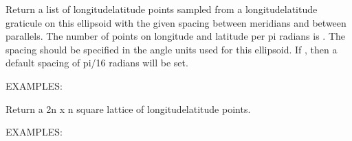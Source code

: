 \documentclass[a4paper,12ptopenany,oneside,english]{sphinxmanual}
\begin{document}
\begin{fulllineitems}
\begin{fulllineitems}
\end{fulllineitems}


\begin{fulllineitems}
\label{\detokenize{ellipsoids:rhealpixdggs.ellipsoids.Ellipsoid.graticule}}
\pysigstartsignatures
\pysiglinewithargsret
{}
{\sphinxparamcomma {}}
{}
\pysigstopsignatures
\sphinxAtStartPar
Return a list of longitude\sphinxhyphen{}latitude points sampled from a
longitude\sphinxhyphen{}latitude graticule on this ellipsoid with the given
spacing between meridians and between parallels.
The number of points on longitude and latitude per pi radians is .
The spacing should be specified in the angle units used for this
ellipsoid.
If , then a default spacing of pi/16 radians will be set.

\sphinxAtStartPar
EXAMPLES:

\begin{sphinxVerbatim}[commandchars=\\\{\}]
  
\end{sphinxVerbatim}

\end{fulllineitems}


\begin{fulllineitems}
\label{\detokenize{ellipsoids:rhealpixdggs.ellipsoids.Ellipsoid.lattice}}
\pysigstartsignatures
\pysiglinewithargsret
{}
{}
{}
\pysigstopsignatures
\sphinxAtStartPar
Return a 2n x n square lattice of longitude\sphinxhyphen{}latitude points.

\sphinxAtStartPar
EXAMPLES:


\end{fulllineitems}
\end{fulllineitems}
\end{document}
